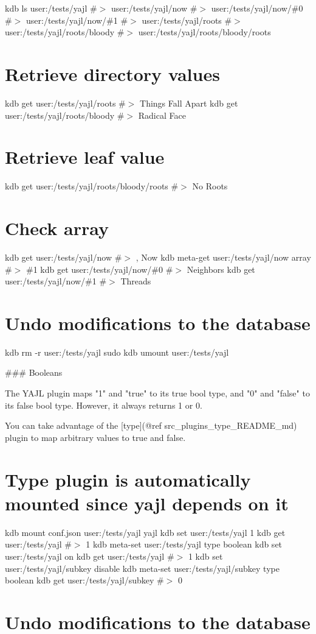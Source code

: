 kdb ls user\+:/tests/yajl \#$>$ user\+:/tests/yajl/now \#$>$ user\+:/tests/yajl/now/\#0 \#$>$ user\+:/tests/yajl/now/\#1 \#$>$ user\+:/tests/yajl/roots \#$>$ user\+:/tests/yajl/roots/bloody \#$>$ user\+:/tests/yajl/roots/bloody/roots\hypertarget{autotoc_md777_autotoc_md801}{}\section{Retrieve directory values}\label{autotoc_md777_autotoc_md801}
kdb get user\+:/tests/yajl/roots \#$>$ Things Fall Apart kdb get user\+:/tests/yajl/roots/bloody \#$>$ Radical Face\hypertarget{autotoc_md777_autotoc_md802}{}\section{Retrieve leaf value}\label{autotoc_md777_autotoc_md802}
kdb get user\+:/tests/yajl/roots/bloody/roots \#$>$ No Roots\hypertarget{autotoc_md777_autotoc_md803}{}\section{Check array}\label{autotoc_md777_autotoc_md803}
kdb get user\+:/tests/yajl/now \#$>$ , Now kdb meta-\/get user\+:/tests/yajl/now array \#$>$ \#1 kdb get user\+:/tests/yajl/now/\#0 \#$>$ Neighbors kdb get user\+:/tests/yajl/now/\#1 \#$>$ Threads\hypertarget{autotoc_md777_autotoc_md804}{}\section{Undo modifications to the database}\label{autotoc_md777_autotoc_md804}
kdb rm -\/r user\+:/tests/yajl sudo kdb umount user\+:/tests/yajl 
\begin{DoxyCode}
### Booleans

The YAJL plugin maps "1" and "true" to its true bool type, and "0" and "false" to its false bool type.
However, it always returns 1 or 0.

You can take advantage of the [type](@ref src\_plugins\_type\_README\_md) plugin to map arbitrary values to
       true and false.
\end{DoxyCode}
 \hypertarget{autotoc_md777_autotoc_md805}{}\section{Type plugin is automatically mounted since yajl depends on it}\label{autotoc_md777_autotoc_md805}
kdb mount conf.\+json user\+:/tests/yajl yajl kdb set user\+:/tests/yajl 1 kdb get user\+:/tests/yajl \#$>$ 1 kdb meta-\/set user\+:/tests/yajl type boolean kdb set user\+:/tests/yajl on kdb get user\+:/tests/yajl \#$>$ 1 kdb set user\+:/tests/yajl/subkey disable kdb meta-\/set user\+:/tests/yajl/subkey type boolean kdb get user\+:/tests/yajl/subkey \#$>$ 0\hypertarget{autotoc_md777_autotoc_md806}{}\section{Undo modifications to the database}\label{autotoc_md777_autotoc_md806}
